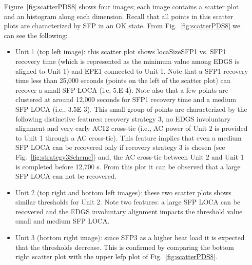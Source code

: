 Figure~\ref{fig:scatterPDS8} shows four images; each image contains a scatter plot and an histogram along each 
dimension. Recall that all points in this scatter plots are characterized by SFP in an OK state.
From Fig.~\ref{fig:scatterPDS8} we can see the following:
\begin{itemize}
  \item Unit 1 (top left image): this scatter plot shows locaSizeSFP1 vs. SFP1 recovery time (which is represented 
        as the minimum value among EDGS is aligned to Unit 1) and EPE1 connected to Unit 1. Note that a SFP1 recovery 
        time less than 25,000 seconds (points on the left of the scatter plot) can recover a small SFP LOCA (i.e, 5.E-4). 
        Note also that a few points are clustered at around 12,000 seconds for SFP1 recovery time and a medium SFP LOCA (i.e., 3.5E-3). 
        This small group of points are characterized by the following distinctive features: recovery strategy 3, no EDGS involuntary 
        alignment and very early AC12 cross-tie (i.e., AC power of Unit 2 is provided to Unit 1 through a AC 
        cross-tie). This feature implies that even a medium SFP LOCA can be recovered only if recovery strategy 3 is
        chosen (see Fig.~\ref{fig:strategy3Scheme}) and, the AC cross-tie between Unit 2 and Unit 1 is completed 
        before 12,700 s. From this plot it can be observed that a large SFP LOCA can not be recovered.
  \item Unit 2 (top right and bottom left images): these two scatter plots shows similar thresholds for Unit 2. 
        Note two features: a large SFP LOCA can be recovered and the EDGS involuntary alignment impacts the threshold value 
        small and medium SFP LOCA.
  \item Unit 3 (bottom right image): since SFP3 as a higher heat load it is expected that the thresholds decrease. This
        is confirmed by comparing the bottom right scatter plot with the upper lefp plot of Fig.~\ref{fig:scatterPDS8}.
\end{itemize}


